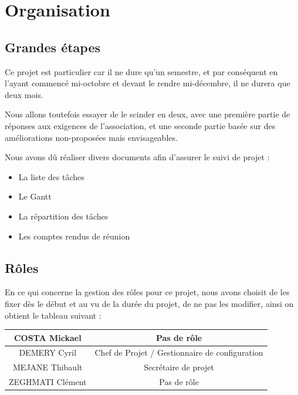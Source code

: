 \documentclass[11pt]{report}
\begin{document}
\section{Organisation}
\subsection{Grandes étapes}
Ce projet est particulier car il ne dure qu'un semestre, et par conséquent en 
l'ayant commencé mi-octobre et devant le rendre mi-décembre, il ne durera que 
deux mois. \\
\par Nous allons toutefois essayer de le scinder en deux, avec une première 
partie de réponses aux exigences de l’association, et une seconde partie basée 
sur des améliorations non-proposées mais envisageables.

Nous avons dû réaliser divers documents afin d'assurer le suivi de projet : 
\begin{itemize}
    \item La liste des tâches
    \item Le Gantt
    \item La répartition des tâches
    \item Les comptes rendus de réunion \\
\end{itemize}

\subsection{Rôles}
En ce qui concerne la gestion des rôles pour ce projet, nous avons choisit de 
les fixer dès le début et au vu de la durée du projet, de ne pas les modifier, 
ainsi on obtient le tableau suivant :  
\par
\begin{tabular}{ | c | c | }
\hline 
   COSTA Mickael & Pas de rôle  \\ \hline 
   DEMERY Cyril & Chef de Projet / Gestionnaire de configuration \\ \hline 
   MEJANE Thibault & Secrétaire de projet \\ \hline 
   ZEGHMATI Clément & Pas de rôle \\ \hline
 \end{tabular}
\end{document}
